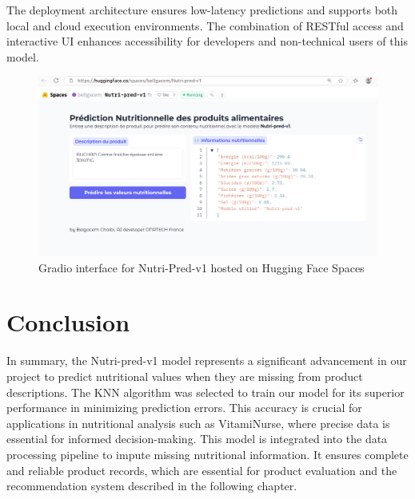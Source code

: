 \vspace{1cm}
The deployment architecture ensures low-latency predictions and supports both local and cloud execution environments. The combination of RESTful access and interactive UI enhances accessibility for developers and non-technical users of this model.

\begin{figure}[H]
    \centering
    \includegraphics[width=1.15\textwidth]{images/Nutri-pred_Huggingface.png}
    \caption{Gradio interface for Nutri-Pred-v1 hosted on Hugging Face Spaces}
    \label{fig:gradio_ui}
\end{figure}
\vspace{1cm}
\section{Conclusion}
\par In summary, the Nutri-pred-v1 model represents a significant advancement in our project to predict nutritional values when they are missing
from product descriptions. The KNN algorithm was selected to train
our model for its superior performance in minimizing prediction errors.
This accuracy is crucial for applications in nutritional analysis such as
VitamiNurse, where precise data is essential for informed decision-making. This model is integrated into the data processing pipeline to impute
missing nutritional information. It ensures complete and reliable product
records, which are essential for product evaluation and the recommendation system described in the following chapter.